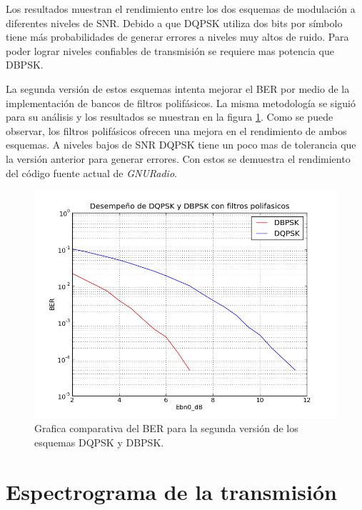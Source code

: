 Los resultados muestran el rendimiento entre los dos esquemas de modulaci\'on a diferentes niveles
de SNR. Debido a que DQPSK utiliza dos bits por s\'imbolo tiene m\'as probabilidades de generar
errores a niveles muy altos de ruido. Para poder lograr niveles confiables de transmisi\'on se
requiere mas potencia que DBPSK.

La segunda versi\'on de estos esquemas intenta mejorar el BER por medio de la implementaci\'on de
bancos de filtros polif\'asicos. La misma metodolog\'ia se sigui\'o para su an\'alisis y los
resultados se muestran en la figura \ref{fig:berpoly}. Como se puede observar, los filtros
polif\'asicos ofrecen una mejora en el rendimiento de ambos esquemas. A niveles bajos de SNR DQPSK
tiene un poco mas de tolerancia que la versi\'on anterior para generar errores. Con estos se
demuestra el rendimiento del c\'odigo fuente actual de \emph{GNURadio}. 

\begin{figure}[t]
  \centering
  \includegraphics[scale=0.7]{figs/berpoly}
  \caption{Grafica comparativa del BER para la segunda versi\'on de los esquemas DQPSK y DBPSK.}
  \label{fig:berpoly}
\end{figure}

\section{Espectrograma de la transmisi\'on}

